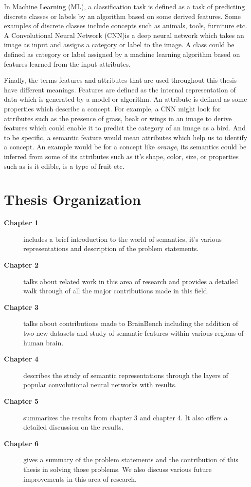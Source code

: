 In Machine Learning (ML), a classification task is defined as a task of predicting discrete classes or labels by an algorithm based on some derived features. Some examples of discrete classes include concepts such as animals, tools, furniture etc. A Convolutional Neural Network (CNN)is a deep neural network which takes an image as input and assigns a category or label to the image. A class could be defined as category or label assigned by a machine learning algorithm based on features learned from the input attributes.

Finally, the terms features and attributes that are used throughout this thesis have different meanings. Features are defined as the internal representation of data which is generated by a model or algorithm. An attribute is defined as some properties which describe a concept. For example, a CNN might look for attributes such as the presence of grass, beak or wings in an image to derive features which could enable it to predict the category of an image as a bird. And to be specific, a semantic feature would mean attributes which help us to identify a concept. An example would be for a concept like \textit{orange}, its semantics could be inferred from some of its attributes such as  it's shape, color, size, or properties such as is it edible, is a type of fruit etc. 
















\section{Thesis Organization}

\begin{description}
\item[\textbf{Chapter 1}] includes a brief introduction to the world of semantics, it's various representations and description of the problem statements.
\item[\textbf{Chapter 2}] talks about related work in this area of research and provides a detailed walk through of all the major contributions made in this field. 
\item[\textbf{Chapter 3}] talks about contributions made to BrainBench including the addition of two new datasets and study of semantic features within various regions of human brain.
\item[\textbf{Chapter 4}] describes the study of semantic representations  through the layers of popular convolutional neural networks with results.
\item[\textbf{Chapter 5}] summarizes the results from chapter 3 and chapter 4. It also offers a detailed discussion on the results.
\item[\textbf{Chapter 6}] gives a summary of the problem statements and the contribution of this thesis in solving those problems. We also discuss various future improvements in this area of research.
\end{description}



